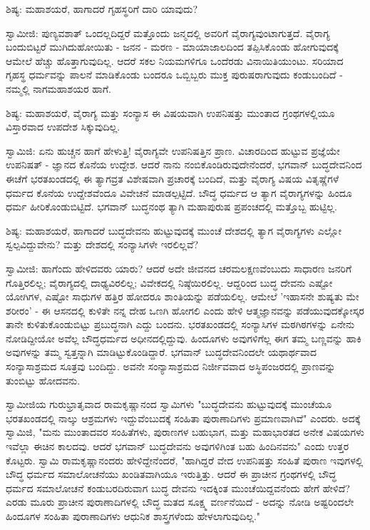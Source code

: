 ಶಿಷ್ಯ: ಮಹಾಶಯರೆ, ಹಾಗಾದರೆ ಗೃಹಸ್ಥರಿಗೆ ದಾರಿ ಯಾವುದು?

ಸ್ವಾಮೀಜಿ: ಪುಣ್ಯವಶಾತ್ ಒಂದಲ್ಲದಿದ್ದರೆ ಮತ್ತೊಂದು ಜನ್ಮದಲ್ಲಿ ಅವರಿಗೆ ವೈರಾಗ್ಯವುಂಟಾಗುತ್ತದೆ. ವೈರಾಗ್ಯ ಬಂದುಬಿಟ್ಟರೆ ಮುಗಿದುಹೋಯಿತು - ಜನನ - ಮರಣ - ಮಾಯಾಜಾಲದಿಂದ ತಪ್ಪಿಸಿಕೊಂಡು ಹೋಗುವುದಕ್ಕೆ ಆಮೇಲೆ ಹೆಚ್ಚು ಹೊತ್ತಾಗುವುದಿಲ್ಲ. ಆದರೆ ಸಕಲ ನಿಯಮಗಳಿಗೂ ಒಂದೆರಡು ವಿನಾಯಿತಿಯುಂಟು. ಸರಿಯಾದ ಗೃಹಸ್ಥ ಧರ್ಮವನ್ನು ಪಾಲನೆ ಮಾಡಿಕೊಂಡು ಬಂದರೂ ಒಬ್ಬಿಬ್ಬರು ಮುಕ್ತ ಪುರುಷರಾಗುವುದು ಕಂಡುಬಂದಿದೆ - ನಮ್ಮಲ್ಲಿ ನಾಗಮಹಾಶಯರ ಹಾಗೆ.

ಶಿಷ್ಯ: ಮಹಾಶಯರೆ, ವೈರಾಗ್ಯ ಮತ್ತು ಸಂನ್ಯಾಸ ಈ ವಿಷಯವಾಗಿ ಉಪನಿಷತ್ತು ಮುಂತಾದ ಗ್ರಂಥಗಳಲ್ಲಿಯೂ ವಿಸ್ತಾರವಾದ ಉಪದೇಶ ಸಿಕ್ಕುವುದಿಲ್ಲ.

ಸ್ವಾಮಿಜಿ: ಏನು ಹುಚ್ಚನ ಹಾಗೆ ಹೇಳುತ್ತಿ! ವೈರಾಗ್ಯವೇ ಉಪನಿಷತ್ತಿನ ಪ್ರಾಣ. ವಿಚಾರದಿಂದ ಹುಟ್ಟುವ ಪ್ರಜ್ಞೆಯೇ ಉಪನಿಷತ್ - ಜ್ಞಾನದ ಕೊನೆಯ ಉದ್ದೇಶ. ಆದರೆ ನಾನು ನಂಬಿಕೊಂಡಿರುವುದೇನೆಂದರೆ, ಭಗವಾನ್ ಬುದ್ಧದೇವನಿಂದ ಈಚೆಗೆ ಭರತಖಂಡದಲ್ಲಿ ಈ ತ್ಯಾಗವ್ರತ ವಿಶೇಷವಾಗಿ ಪ್ರಚಾರಕ್ಕೆ ಬಂದಿದೆ, ಮತ್ತು ವೈರಾಗ್ಯ ವಿಷಯ ವಿತೃಷ್ಣೆಗಳೆ ಧರ್ಮದ ಕೊನೆಯ ಉದ್ದೇಶವೆಂದೂ ವಿವೇಚನೆ ಮಾಡಲ್ಪಟ್ಟಿದೆ. ಬೌದ್ಧ ಧರ್ಮದ ಆ ತ್ಯಾಗ ವೈರಾಗ್ಯಗಳನ್ನು ಹಿಂದೂ ಧರ್ಮ ಹೀರಿಕೊಂಡುಬಿಟ್ಟಿದೆ. ಭಗವಾನ್ ಬುದ್ಧನಂಥ ತ್ಯಾಗಿ ಮಹಾಪುರುಷ ಪ್ರಪಂಚದಲ್ಲಿ ಮತ್ತೊಬ್ಬ ಹುಟ್ಟಿಲ್ಲ.

ಶಿಷ್ಯ: ಮಹಾಶಯರೆ, ಹಾಗಾದರೆ ಬುದ್ಧದೇವನು ಹುಟ್ಟುವುದಕ್ಕೆ ಮುಂಚೆ ದೇಶದಲ್ಲಿ ತ್ಯಾಗ ವೈರಾಗ್ಯಗಳು ಎಲ್ಲೋ ಸ್ವಲ್ಪವಿದ್ದುವೇನು? ಮತ್ತು ದೇಶದಲ್ಲಿ ಸಂನ್ಯಾಸಿಗಳೇ ಇರಲಿಲ್ಲವೆ?

ಸ್ವಾಮೀಜಿ: ಹಾಗೆಂದು ಹೇಳಿದವರು ಯಾರು? ಆದರೆ ಅದೇ ಜೀವನದ ಚರಮಲಕ್ಷಣವೆಂಬುದು ಸಾಧಾರಣ ಜನರಿಗೆ ಗೊತ್ತಿರಲಿಲ್ಲ; ವೈರಾಗ್ಯದಲ್ಲಿ ದಾಢ್ಯವಿರಲಿಲ್ಲ; ವಿವೇಕದಲ್ಲಿ ನಿಷ್ಠೆಯಿರಲಿಲ್ಲ. ಆದ್ದರಿಂದ ಬುದ್ಧ ದೇವನು ಎಷ್ಟೋ ಯೋಗಿಗಳ, ಎಷ್ಟೋ ಸಾಧುಗಳ ಹತ್ತಿರ ಹೋದರೂ ಶಾಂತಿಯನ್ನು ಪಡೆಯಲಿಲ್ಲ. ಆಮೇಲೆ 'ಇಹಾಸನೇ ಶುಷ್ಯತು ಮೇ ಶರೀರಂ' - ಈ ಆಸನದಲ್ಲಿ ಕುಳಿತೇ ನನ್ನ ದೇಹ ಒಣಗಿ ಹೋಗಲಿ ಎಂದು ಹೇಳಿ ಆತ್ಮಜ್ಞಾನವನ್ನು ಪಡೆಯುವುದಕ್ಕೋಸ್ಕರ ತಾನೇ ಕುಳಿತುಕೊಂಡುಬಿಟ್ಟು ಪ್ರಬುದ್ಧನಾಗಿ ಎದ್ದು ಬಂದನು. ಭರತಖಂಡದಲ್ಲಿ ಸಂನ್ಯಾಸಿಗಳ ಮಠಗಿಠಗಳನ್ನು ಏನೇನು ನೋಡಿದ್ದೀಯೋ ಅವೆಲ್ಲ ಬೌದ್ಧಧರ್ಮದ ಅಧೀನದಲ್ಲಿದ್ದುವು. ಹಿಂದೂಗಳು ಅವುಗಳಿಗೆಲ್ಲ ಈಗ ತಮ್ಮ ಬಣ್ಣವನ್ನು ಹಾಕಿ ಅವುಗಳನ್ನು ತಮ್ಮ ಸ್ವತ್ತನ್ನಾಗಿ ಮಾಡಿಟ್ಟುಕೊಂಡಿದ್ದಾರೆ. ಭಗವಾನ್ ಬುದ್ಧದೇವನಿಂದಲೇ ಯಥಾರ್ಥವಾದ ಸಂನ್ಯಾಸಾಶ್ರಮದ ಸೂತ್ರವು ಬಂದಿದ್ದು. ಅವನೇ ಸಂನ್ಯಾಸಾಶ್ರಮದ ನಿರ್ಜೀವವಾದ ಅಸ್ಥಿಪಂಜರದಲ್ಲಿ ಪ್ರಾಣವನ್ನು ತುಂಬಿಟ್ಟು ಹೋದವನು.

ಸ್ವಾಮೀಜಿಯ ಗುರುಭ್ರಾತೃವಾದ ರಾಮಕೃಷ್ಣಾನಂದ ಸ್ವಾಮಿಗಳು "ಬುದ್ಧದೇವನು ಹುಟ್ಟುವುದಕ್ಕೆ ಮುಂಚೆಯೂ ಭರತಖಂಡದಲ್ಲಿ ನಾಲ್ಕು ಆಶ್ರಮಗಳು ಇದ್ದುವೆಂಬುದಕ್ಕೆ ಸಂಹಿತಾ ಪುರಾಣಾದಿಗಳು ಪ್ರಮಾಣವಾಗಿವೆ" ಎಂದರು. ಅದಕ್ಕೆ ಸ್ವಾಮಿಜಿ, "ಮನು ಮುಂತಾದವರ ಸಂಹಿತೆಗಳು, ಪುರಾಣಗಳ ಬಹುಭಾಗ, ಮತ್ತು ಮಹಾಭಾರತದ ಅನೇಕ ವಿಷಯಗಳು ಇವೆಲ್ಲಾ ಈಚಿನ ಕಾಲದವು. ಆದರೆ ಭಗವಾನ್ ಬುದ್ಧದೇವನು ಅವುಗಳಿಗಿಂತ ಬಹು ಹಿಂದಿನವನು" ಎಂದು ಉತ್ತರ ಕೊಟ್ಟರು. ಸ್ವಾಮಿ ರಾಮಕೃಷ್ಣಾನಂದರು ಹೇಳಿದ್ದೇನೆಂದರೆ, "ಹಾಗಿದ್ದರೆ ವೇದ ಉಪನಿಷತ್ತು ಸಂಹಿತೆ ಪುರಾಣ ಇವುಗಳಲ್ಲಿ ಬೌದ್ಧ ಧರ್ಮದ ಸಮಾಲೋಚನೆಯು ಖಂಡಿತವಾಗಿಯೂ ಇರುತ್ತಿತ್ತು. ಆದರೆ ಈ ಪ್ರಾಚೀನ ಗ್ರಂಥಗಳಲ್ಲಿ ಬೌದ್ಧ ಧರ್ಮದ ಸಮಾಲೋಚನೆ ಕಂಡುಬರದಿರುವಾಗ ಬುದ್ಧ ದೇವನು ಇದಕ್ಕಿಂತ ಮುಂಚೆಯಿದ್ದವನೆಂದು ಹೇಗೆ ಹೇಳಿದೆ? ಎರಡು ಮೂರು ಪ್ರಾಚೀನ ಪುರಾಣಾದಿಗಳಲ್ಲಿ ಬೌದ್ಧ ಮತದ ಸೂಕ್ಷ್ಮ ವರ್ಣನೆಯಿದೆ - ಅದನ್ನು ನೋಡಿ ಅಷ್ಟರಿಂದಲೇ ಹಿಂದೂಗಳ ಸಂಹಿತಾ ಪುರಾಣಾದಿಗಳು ಆಧುನಿಕ ಶಾಸ್ತ್ರಗಳೆಂದು ಹೇಳಲಾಗುವುದಿಲ್ಲ."


